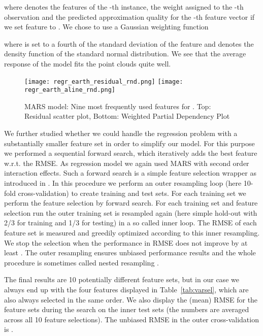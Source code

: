 \documentclass{article}
\begin{document}
where  denotes the features of the -th instance,
 the weight assigned to the -th observation and  the predicted approximation quality for the
-th feature vector if we set feature  to . We chose to use a
Gaussian weighting function

where  is set to a fourth of the standard deviation of the
feature and  denotes the density function of the standard normal distribution. We see that the average response of the model fits the point
clouds quite well.

\begin{figure}
  \centering
  \texttt{[image: regr\_earth\_residual\_rnd.png]}\vspace*{0.2cm}
  \texttt{[image: regr\_earth\_aline\_rnd.png]}
  \caption{MARS model: Nine most frequently used features for
    . Top: Residual scatter plot, Bottom: Weighted Partial
    Dependency Plot}
  \label{fig:MARS}
\end{figure}

We further studied whether we could handle the regression problem with
a substantially smaller feature set in order to simplify our
model. For this purpose we performed a sequential forward search,
which iteratively adds the best feature w.r.t. the RMSE. As
regression model we again used MARS with second order interaction
effects. Such a forward search is a simple feature selection wrapper
as introduced in \cite{Kohavi1997}. In this procedure we perform an
outer resampling loop (here 10-fold cross-validation) to create
training and test sets. For each training set we perform the feature
selection by forward search. For each training set and feature
selection run the outer training set is resampled again (here simple
hold-out with 2/3 for training and 1/3 for testing) in a so called
inner loop. The RMSE of each feature set is measured and greedily
optimized according to this inner resampling. We stop the selection
when the performance in RMSE does not improve by at least . The outer resampling ensures unbiased performance
results and the whole procedure is sometimes called nested resampling \cite{BMTW12}.

The final results are 10 potentially different feature sets, but in
our case we always end up with the four features displayed in
Table~\ref{tab:varsel}, which are also always selected in the same
order. We also display the (mean) RMSE for the feature sets during
the search on the inner test sets (the numbers are averaged across all 10
feature selections).  The unbiased RMSE in the outer cross-validation
is .
\end{document}
